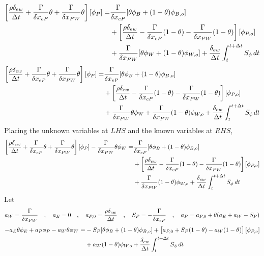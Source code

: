 \documentclass[a4paper, 12pt]{report}
\begin{document}
\begin{center}
\begin{equation*}
\begin{split}
\left[\frac{\rho\delta_{ew}}{\Delta t} + \frac{\Gamma}{\delta x_{eP}}\theta + \frac{\Gamma}{\delta x_{PW}}\theta\right][\phi_{P}] = & \frac{\Gamma }{\delta x_{eP}}[\theta\phi_{B} + (1-\theta)\phi_{B,o}]\\ & +\left[\frac{\rho\delta_{ew}}{\Delta t} - \frac{\Gamma }{\delta x_{eP}}(1-\theta) - \frac{\Gamma }{\delta x_{PW}}(1-\theta)\right][\phi_{P,o}] \\ &  + \frac{\Gamma }{\delta x_{PW}}[\theta\phi_{W} + (1-\theta)\phi_{W,o}] + \frac{\delta_{ew}}{\Delta t}\int^{t+\Delta t}_{t} S_\phi\,dt 
\end{split}
\end{equation*}
\begin{equation*}
\begin{split}
\left[\frac{\rho\delta_{ew}}{\Delta t} + \frac{\Gamma}{\delta x_{eP}}\theta + \frac{\Gamma}{\delta x_{PW}}\theta\right][\phi_{P}] = & \frac{\Gamma }{\delta x_{eP}}[\theta\phi_{B} + (1-\theta)\phi_{B,o}]\\ & +\left[\frac{\rho\delta_{ew}}{\Delta t} - \frac{\Gamma }{\delta x_{eP}}(1-\theta) - \frac{\Gamma }{\delta x_{PW}}(1-\theta)\right][\phi_{P,o}] \\ &  + \frac{\Gamma }{\delta x_{PW}}\theta\phi_{W} + \frac{\Gamma }{\delta x_{PW}}(1-\theta)\phi_{W,o} + \frac{\delta_{ew}}{\Delta t}\int^{t+\Delta t}_{t} S_\phi\,dt 
\end{split}
\end{equation*}
Placing the unknown variables at $LHS$ and the known variables at $RHS$,
\begin{equation*}
\begin{split}
\left[\frac{\rho\delta_{ew}}{\Delta t} + \frac{\Gamma}{\delta x_{eP}}\theta + \frac{\Gamma}{\delta x_{PW}}\theta\right][\phi_{P}]  - \frac{\Gamma }{\delta x_{PW}}\theta\phi_{W} = & \frac{\Gamma }{\delta x_{eP}}[\theta\phi_{B} + (1-\theta)\phi_{B,o}]\\ & +\left[\frac{\rho\delta_{ew}}{\Delta t} - \frac{\Gamma }{\delta x_{eP}}(1-\theta) - \frac{\Gamma }{\delta x_{PW}}(1-\theta)\right][\phi_{P,o}] \\ &  + \frac{\Gamma }{\delta x_{PW}}(1-\theta)\phi_{W,o} + \frac{\delta_{ew}}{\Delta t}\int^{t+\Delta t}_{t} S_\phi\,dt 
\end{split}
\end{equation*}
Let
$$a_W = \frac{\Gamma }{\delta x_{PW}} \quad,\quad a_E = 0 \quad,\quad a_{P,0} = \frac{\rho\delta_{ew}}{\Delta t} \quad,\quad S_P = -\frac{\Gamma}{\delta x_{eP}} \quad,\quad a_{P} = a_{P,0} + \theta(a_E + a_W - S_P)$$
\begin{equation*}
\begin{split}
-a_E\theta\phi_E + a_{P}\phi_{P}  - a_W\theta\phi_{W} = & -S_P[\theta\phi_{B} + (1-\theta)\phi_{B,o}] + \left[a_{P,0} + S_P(1-\theta) - a_W(1-\theta)\right][\phi_{P,o}] \\ &  + a_W(1-\theta)\phi_{W,o} + \frac{\delta_{ew}}{\Delta t}\int^{t+\Delta t}_{t} S_\phi\,dt 
\end{split}
\end{equation*}

\end{center}
\end{document}
